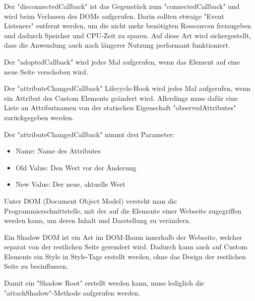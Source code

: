    
Der "{\ttfamily disconnectedCallback}" ist das Gegenstück zum "{\ttfamily connectedCallback}" und wird beim Verlassen des DOMs aufgerufen. Darin sollten etwaige "Event Listeners" entfernt werden, um die nicht mehr benötigten Ressourcen freizugeben und dadurch Speicher und CPU-Zeit zu sparen. 
Auf diese Art wird sichergestellt, dass die Anwendung auch nach längerer Nutzung performant funktioniert.


Der "{\ttfamily adoptedCallback}" wird jedes Mal aufgerufen, wenn das Element auf eine neue Seite verschoben wird.


Der "{\ttfamily attributeChangedCallback}" Lifecycle-Hook wird jedes Mal aufgerufen, wenn ein Attribut des Custom Elements geändert wird. Allerdings muss dafür eine Liste an Attributnamen von der statischen Eigenschaft "{\ttfamily observedAttributes}" zurückgegeben werden. 
    
Der "{\ttfamily attributeChangedCallback}" nimmt drei Parameter:
\begin{itemize}
    \item Name: Name des Attributes
    \item Old Value: Den Wert vor der Änderung
    \item New Value: Der neue, aktuelle Wert 
\end{itemize}


\pagebreak
{}

Unter DOM (Document Object Model) versteht man die Programmierschnittstelle, mit der auf die Elemente einer Webseite zugegriffen werden kann, um deren Inhalt und Darstellung zu verändern. \cite{MDNDOM}

Ein Shadow DOM ist ein Ast im DOM-Baum innerhalb der Webseite, welcher separat von der restlichen Seite gerendert wird.
Dadurch kann auch auf Custom Elements ein Style in Style-Tags erstellt werden, ohne das Design der restlichen Seite zu beeinflussen. \cite{MDNShadowRoot}

Damit ein "Shadow Root" erstellt werden kann, muss lediglich die "{\ttfamily attachShadow}"-Methode aufgerufen werden. \cite{MDNShadowRoot}

